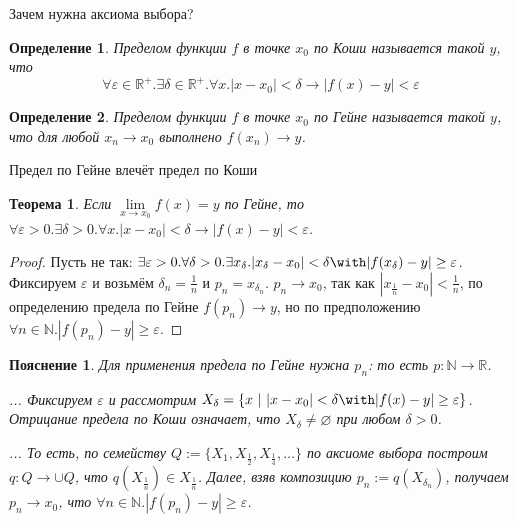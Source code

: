 \documentclass[aspectratio=169]{beamer}
\newtheorem{thm}{Теорема}[section]
\newtheorem{dfn}{Определение}[section]
\newtheorem{snote}{Пояснение}[section]
\begin{document}
\begin{frame}{Зачем нужна аксиома выбора?}
\begin{dfn}Пределом функции $f$ в точке $x_0$ по \emph{Коши} называется такой $y$, что
$$\forall \varepsilon\in\mathbb{R}^+.\exists \delta\in\mathbb{R}^+.\forall x.|x-x_0| < \delta \rightarrow |f(x) - y| < \varepsilon$$
\end{dfn}

\vspace{-0.5cm}
\begin{dfn}Пределом функции $f$ в точке $x_0$ по \emph{Гейне} называется такой $y$, что
для любой $x_n \rightarrow x_0$ выполнено $f(x_n) \rightarrow y$.
\end{dfn}
\end{frame}

\begin{frame}{Предел по Гейне влечёт предел по Коши}
\begin{thm}
Если $\lim\limits_{x \rightarrow x_0}f(x) = y$ по Гейне, то
$\forall \varepsilon>0.\exists \delta>0.\forall x.|x-x_0|<\delta \rightarrow |f(x)-y| < \varepsilon$.
\end{thm}

\begin{proof}
Пусть не так:
$\exists \varepsilon>0.\forall \delta>0.\exists x_\delta.|x_\delta-x_0|<\delta \with |f(x_\delta)-y| \ge \varepsilon$.
Фиксируем $\varepsilon$ и возьмём $\delta_n = \frac{1}{n}$ и $p_n = x_{\delta_n}$. 
$p_n \rightarrow x_0$, так как $|x_\frac{1}{n} - x_0| < \frac{1}{n}$, 
по определению предела по Гейне $f(p_n) \rightarrow y$, 
но по предположению $\forall n\in\mathbb{N}.|f(p_n) - y| \ge \varepsilon$.
\end{proof}\pause

\begin{snote}
Для применения предела по Гейне нужна $p_n$: то есть $p: \mathbb{N}\rightarrow\mathbb{R}$.
\pause

... %
Фиксируем $\varepsilon$ и рассмотрим $X_\delta = \{ x \ |\ |x-x_0| <\delta \with |f(x)-y| \ge \varepsilon\}$.
Отрицание предела по Коши означает, что $X_\delta \ne \varnothing$ при любом $\delta > 0$.
\pause

... То есть, по семейству $Q:=\{ X_1, X_\frac{1}{2}, X_\frac{1}{4}, \dots \}$ 
по аксиоме выбора построим $q: Q \rightarrow \cup Q$, что $q(X_\frac{1}{n}) \in X_\frac{1}{n}$.
Далее, взяв композицию $p_n := q(X_{\delta_n})$, получаем $p_n \rightarrow x_0$, что $\forall n\in\mathbb{N}.|f(p_n) - y| \ge \varepsilon$.
\end{snote}
\end{frame}
\end{document}
